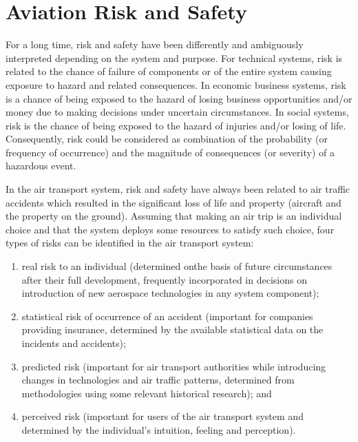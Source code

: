 \documentclass[a4paper, 10pt]{article}
\begin{document}
\section{Aviation Risk and Safety}
For a long time, risk and safety have been differently and
ambiguously interpreted depending on the system and purpose. 
For technical systems, risk is related to the chance of
failure of components or of the entire system causing exposure
to hazard and related consequences. In economic business
systems, risk is a chance of being exposed to the hazard of
losing business opportunities and/or money due to making
decisions under uncertain circumstances. In social systems, risk
is the chance of being exposed to the hazard of injuries and/or
losing of life. Consequently, risk could be considered as
combination of the probability (or frequency of occurrence)
and the magnitude of consequences (or severity) of a hazardous
event.\par

In the air transport system, risk and safety have always been
related to air traffic accidents which resulted in the significant
loss of life and property (aircraft and the property on the
ground). Assuming that making an air trip is an individual
choice and that the system deploys some resources to satisfy
such choice, four types of risks can be identified in the air
transport system:
\begin{enumerate}
		\item real risk to an individual (determined onthe basis of future circumstances after their full development,
				frequently incorporated in decisions on introduction of new
				aerospace technologies in any system component); 
		\item statistical risk of occurrence of an accident (important for companies
				providing insurance, determined by the available statistical data
				on the incidents and accidents); 
		\item predicted risk (important	for air transport authorities while introducing changes in
				technologies and air traffic patterns, determined from
				methodologies using some relevant historical research); and 
		\item perceived risk (important for users of the air transport system
				and determined by the individual’s intuition, feeling and
				perception).
\end{enumerate}
\par
\end{document}
